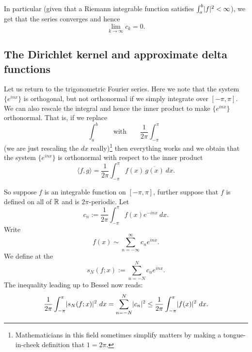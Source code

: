 In particular (given that a Riemann integrable function satisfies
$\int_a^b \lvert {f} \rvert^2 < \infty$), we get that the series
converges and hence
\begin{equation*}
\lim_{k \to \infty} c_k = 0 .
\end{equation*}

\subsection{The Dirichlet kernel and approximate delta functions}

Let us return to the trigonometric Fourier series.  Here we note that the
system $\{ e^{inx} \}$ is orthogonal, but not orthonormal if we simply
integrate over $[-\pi,\pi]$.  We can also rescale the integral
and hence the inner product to make 
$\{ e^{inx} \}$ orthonormal.  That is, if we replace
\begin{equation*}
\int_a^b \qquad \text{with} \qquad
\frac{1}{2\pi} \int_{-\pi}^\pi
\end{equation*}
(we are just rescaling the $dx$ really)\footnote{%
Mathematicians in this field sometimes simplify matters by
making a tongue-in-cheek definition that $1=2\pi$.}
then everything works and we obtain that the system $\{ e^{inx} \}$
is orthonormal with respect to the inner product
\begin{equation*}
\langle f , g \rangle =
\frac{1}{2\pi} \int_{-\pi}^\pi f(x) \, \overline{g(x)} ~ dx .
\end{equation*}

So suppose $f$ is an integrable function on $[-\pi,\pi]$,
further suppose
that $f$ is defined on all of ${\mathbb{R}}$ and is $2\pi$-periodic.
Let
\begin{equation*}
c_n := 
\frac{1}{2\pi} \int_{-\pi}^\pi
f(x) e^{-inx} ~ dx .
\end{equation*}
Write
\begin{equation*}
f(x) \sim
\sum_{n=-\infty}^\infty c_n e^{inx} .
\end{equation*}
We define at the \emph{}
\begin{equation*}
s_N(f;x) := 
\sum_{n=-N}^N c_n e^{inx} .
\end{equation*}
The inequality leading up to Bessel now reads:
\begin{equation*}
\frac{1}{2\pi} \int_{-\pi}^\pi
\lvert {s_N(f;x)} \rvert^2 ~ dx =
\sum_{n=-N}^N \lvert {c_n} \rvert^2
\leq
\frac{1}{2\pi} \int_{-\pi}^\pi
\lvert {f(x)} \rvert^2
~ dx .
\end{equation*}

